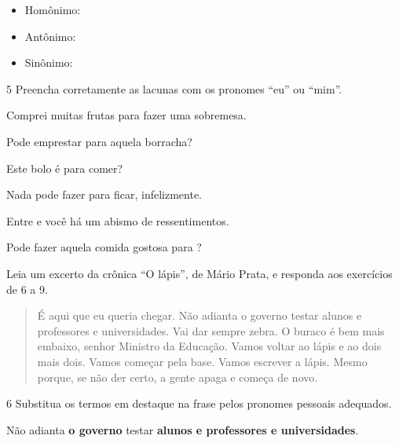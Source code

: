 \begin{itemize}
\item Homônimo: 
\item Antônimo: 
\item Sinônimo: 
\end{itemize}

\num{5} Preencha corretamente as lacunas com os pronomes ``eu'' ou
``mim''.

\begin{escolha}
\item Comprei muitas frutas para  fazer uma sobremesa.
\item Pode emprestar para  aquela borracha?
\item Este bolo é para  comer?
\item Nada pode fazer para  ficar, infelizmente.
\item Entre  e você há um abismo de ressentimentos.
\item Pode fazer aquela comida gostosa para ?
\end{escolha}

\noindent Leia um excerto da crônica ``O lápis'', de Mário Prata, e responda aos
exercícios de 6 a 9.

\begin{quote}
É aqui que eu queria chegar. Não adianta o governo testar alunos e
professores e universidades. Vai dar sempre zebra. O buraco é bem mais
embaixo, senhor Ministro da Educação. Vamos voltar ao lápis e ao dois
mais dois. Vamos começar pela base. Vamos escrever a lápis. Mesmo
porque, se não der certo, a gente apaga e começa de novo.

\end{quote}

\num{6} Substitua os termos em destaque na frase pelos pronomes pessoais
adequados.

\noindent Não adianta \textbf{o governo} testar \textbf{alunos e professores e
universidades}.


